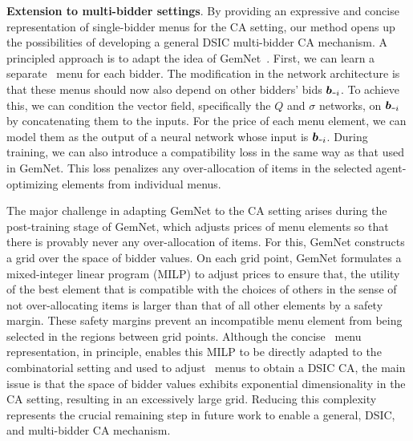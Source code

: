 \textbf{Extension to multi-bidder settings}. By providing an expressive and concise %
representation of single-bidder menus for the CA setting, our method opens up the possibilities of developing a general DSIC multi-bidder CA mechanism. A principled approach is to 
adapt the idea of GemNet~\cite{wang2024gemnet}. 
%
First, we can learn a separate \name~menu for each bidder. The modification in the network architecture is that these menus should now also depend on other bidders' bids ${\bm{b}}_{\textup{\texttt{-}} i}$. To achieve this, we can condition the vector field, specifically the $Q$ and $\sigma$ networks, on ${\bm{b}}_{\textup{\texttt{-}} i}$ by concatenating them to the inputs. For the price of each menu element, we can model them as the output of a neural network whose input is ${\bm{b}}_{\textup{\texttt{-}} i}$. During training, we can also introduce a compatibility loss in the same way as that used in GemNet. This loss penalizes any over-allocation of items in the selected agent-optimizing elements from individual menus.

The major challenge in adapting GemNet to the CA setting  
arises during the post-training stage of GemNet, which adjusts prices of menu elements so that there is provably never any over-allocation of items. For this, GemNet constructs a grid over the space of bidder values. On each grid point, GemNet formulates a mixed-integer linear program (MILP) to adjust prices to ensure that, the utility of the best  element that is compatible with the choices of others in the sense of not over-allocating items is larger than that of all other elements by a safety margin. These safety margins prevent an incompatible menu element from being selected in the regions between grid points. Although the concise \name~menu representation, in principle, enables this MILP to 
be directly adapted to the combinatorial setting and used to adjust \name~menus to obtain a DSIC CA, the main issue is that the space of bidder values exhibits exponential dimensionality in the CA setting, resulting in an excessively large grid. Reducing this complexity represents the crucial 
remaining step in future work to enable 
a general, DSIC, and multi-bidder CA mechanism.